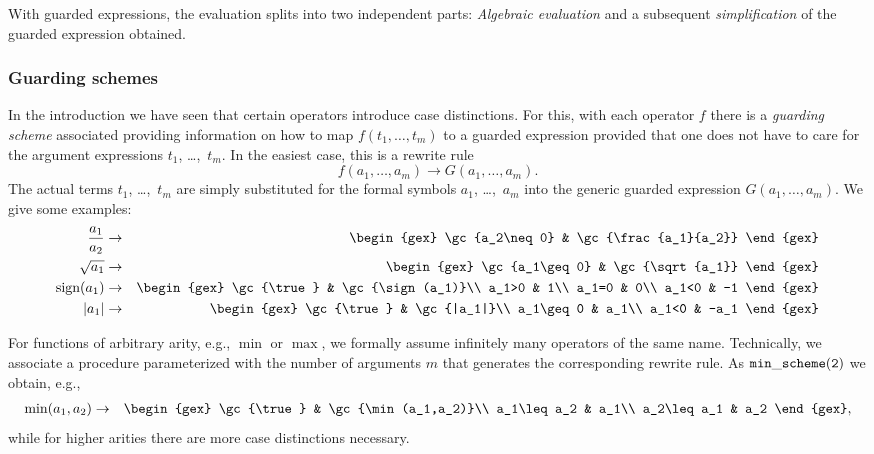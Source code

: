 With guarded expressions, the evaluation splits into two independent
parts: {\em Algebraic evaluation} and a subsequent {\em
simplification} of the guarded expression obtained.
%
\subsubsection{Guarding schemes}
In the introduction we have seen that certain operators introduce case
distinctions. For this, with each operator $f$ there is a {\em
guarding scheme} associated providing information on how to map
$f(t_1,\ldots,t_m)$ to a guarded expression provided that one does not
have to care for the argument expressions $t_1$, \dots,~$t_m$. In the
easiest case, this is a rewrite rule
\[
f(a_1,\ldots,a_m)\to G(a_1,\ldots,a_m).
\]
The actual terms $t_1$, \dots,~$t_m$ are simply substituted for the
formal symbols $a_1$, \dots,~$a_m$ into the generic guarded expression
$G(a_1,\ldots,a_m)$. We give some examples:
\begin{eqnarray}
\frac{a_1}{a_2} & \to &
\begin{gex}
\gc{a_2\neq 0} & \gc{\frac{a_1}{a_2}}
\end{gex}\nonumber\\
\sqrt{a_1} & \to &
\begin{gex}
\gc{a_1\geq 0} & \gc{\sqrt{a_1}}
\end{gex}\nonumber\\
\sign(a_1) & \to &
\begin{gex}
\gc{\true} & \gc{\sign(a_1)}\\
a_1>0 & 1\\
a_1=0 & 0\\
a_1<0 & -1
\end{gex}\nonumber\\
|a_1| & \to &
\begin{gex}
\gc{\true} & \gc{|a_1|}\\
a_1\geq0 & a_1\\
a_1<0 & -a_1
\end{gex}\label{absrewrite}
\end{eqnarray}

For functions of arbitrary arity, e.g., $\min$ or $\max$, we formally
assume infinitely many operators of the same name. Technically, we
associate a procedure parameterized with the number of arguments $m$
that generates the corresponding rewrite rule. As ${\tt
min\_scheme(2)}$ we obtain, e.g.,
\begin{eqnarray}
\min(a_1,a_2) & \to &
\begin{gex}
\gc{\true} & \gc{\min(a_1,a_2)}\\
a_1\leq a_2 & a_1\\
a_2\leq a_1 & a_2
\end{gex}\label{binminscheme},
\end{eqnarray}
while for higher arities there are more case distinctions necessary.

